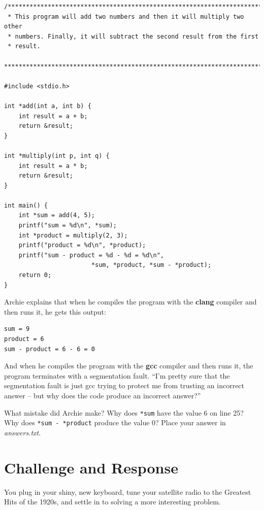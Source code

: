 \begin{lstlisting}
/***********************************************************************
 * This program will add two numbers and then it will multiply two other
 * numbers. Finally, it will subtract the second result from the first
 * result.
 ***********************************************************************/

#include <stdio.h>

int *add(int a, int b) {
    int result = a + b;
    return &result;
}

int *multiply(int p, int q) {
    int result = a * b;
    return &result;
}

int main() {
    int *sum = add(4, 5);
    printf("sum = %d\n", *sum);
    int *product = multiply(2, 3);
    printf("product = %d\n", *product);
    printf("sum - product = %d - %d = %d\n",
                        *sum, *product, *sum - *product);
    return 0;
}
\end{lstlisting}

Archie explains that when he compiles the program with the \textbf{clang}
compiler and then runs it, he gets this output:

\begin{verbatim}
sum = 9
product = 6
sum - product = 6 - 6 = 0
\end{verbatim}

And when he compiles the program with the \textbf{gcc} compiler and then runs
it, the program terminates with a segmentation fault. ``I'm pretty sure that
the segmentation fault is just gcc trying to protect me from trusting an
incorrect answer -- but why does the code produce an incorrect answer?''

What mistake did Archie make? Why does \lstinline{*sum} have the value 6 on
line 25? Why does \lstinline{*sum - *product} produce the value 0? Place your
answer in \textit{answers.txt}.


\section{Challenge and Response}

You plug in your shiny, new keyboard, tune your satellite radio to the
Greatest Hits of the 1920s, and settle in to solving a more interesting problem.

